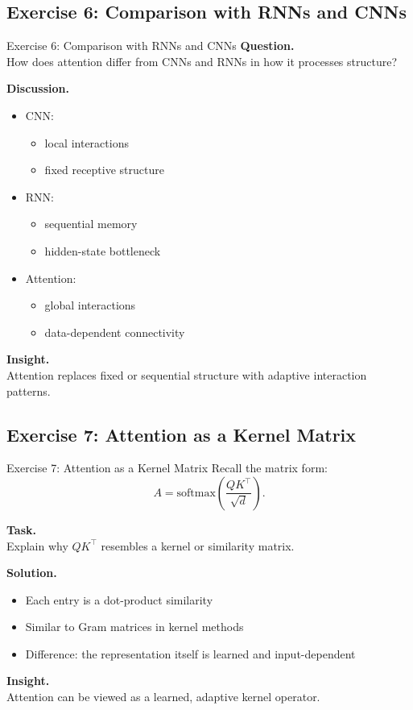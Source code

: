 \documentclass[aspectratio=169,11pt]{beamer}
\begin{document}
\subsection{Exercise 6: Comparison with RNNs and CNNs}
\begin{frame}[t,allowframebreaks]{Exercise 6: Comparison with RNNs and CNNs}
\small
\textbf{Question.}\\ How does attention differ from CNNs and RNNs in how it processes structure?

\textbf{Discussion.}\\ \begin{itemize}
    \item CNN:
    \begin{itemize}
        \item local interactions
        \item fixed receptive structure
    \end{itemize}

    \item RNN:
    \begin{itemize}
        \item sequential memory
        \item hidden-state bottleneck
    \end{itemize}

    \item Attention:
    \begin{itemize}
        \item global interactions
        \item data-dependent connectivity
    \end{itemize}
\end{itemize}

\textbf{Insight.}\\ Attention replaces fixed or sequential structure with adaptive interaction patterns.
\end{frame}

\subsection{Exercise 7: Attention as a Kernel Matrix}
\begin{frame}[t,allowframebreaks]{Exercise 7: Attention as a Kernel Matrix}
\small
Recall the matrix form:
\[
A = \text{softmax}\left(\frac{QK^\top}{\sqrt{d}}\right).
\]

\textbf{Task.}\\ Explain why $QK^\top$ resembles a kernel or similarity matrix.

\textbf{Solution.}\\ \begin{itemize}
    \item Each entry is a dot-product similarity
    \item Similar to Gram matrices in kernel methods
    \item Difference: the representation itself is learned and input-dependent
\end{itemize}

\textbf{Insight.}\\ Attention can be viewed as a learned, adaptive kernel operator.
\end{frame}
\end{document}
